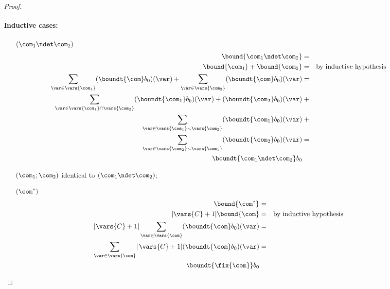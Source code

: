 \begin{proof}
  \paragraph*{Inductive cases:\\}
  \begin{itemize}[label={}]
  \item[\((\com_1 \ndet \com_2)\)]
    \begin{align*}
      \bound{\com_1 \ndet \com_2} & = &\\
      \bound{\com_1} + \bound{\com_2} & = & \text{by inductive hypothesis}\\
      \sum_{\var\in \vars{\com_1}} (\boundt{\com}b_0)(\var) + \sum_{\var\in \vars{\com_2}} (\boundt{\com}b_0)(\var) & = &\\
      \sum_{\var\in \vars{\com_1}\cap \vars{\com_2}} (\boundt{\com_1}b_0)(\var)+(\boundt{\com_2}b_0)(\var) & \;+ & \\
      \sum_{\var\in \vars{\com_1}\smallsetminus \vars{\com_2}} (\boundt{\com_1}b_0)(\var) & \;+ & \\
      \sum_{\var\in \vars{\com_2}\smallsetminus \vars{\com_1}} (\boundt{\com_2}b_0)(\var) & = & \\
      \boundt{\com_1 \ndet \com_2}b_0 & &
    \end{align*}
  \item[\((\com_1; \com_2)\)] identical to \((\com_1 \ndet \com_2)\);
  \item[\((\com^*)\)]
    \begin{align*}
      \bound{\com^*} & = &\\
      |\vars{C}+1|\bound{\com} & = & \text{by inductive hypothesis} \\
      |\vars{C}+1|\sum_{\var\in \vars{\com}} (\boundt{\com}b_0)(\var) & = &\\
      \sum_{\var\in \vars{\com}} |\vars{C}+1|(\boundt{\com}b_0)(\var) & = &\\
      \boundt{\fix{\com}}b_0 & &
    \end{align*}
  \end{itemize}
\end{proof}

